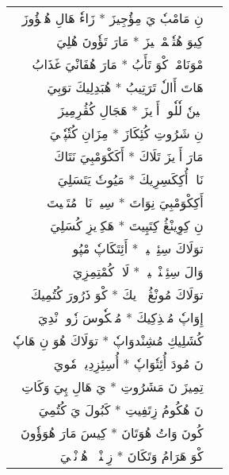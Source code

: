 \documentclass[a4paper, 12pt]{report}
\begin{document}
\begin{longtable}{rl}
\textarabic{نِ مَامْبٗ يَ مِؤُجِيزَ  *  زَاءٗ هَالِ هُڠٖؤُوزَ} & \\ 
\textarabic{كِيوَ هُتٗبٖمْبٖلٖيزَ  *  مَارَ تَؤٗونَ هُلِيَ} & \\ 
[8mm] 

\textarabic{مْوَنَامْكٖ كْوَ تَأَبُ  *  مَارَ هُفَانْيَ غَذَابُ} & \\ 
\textarabic{هَاتَ أَالٗ تَرَتِيبُ  *  هُبَدِلِيكَ توَبِيَ} & \\ 
[8mm] 

\textarabic{نٖينٗ لٗلٗوتٖ أَوٖيزَ  *  هَجَالِ كُڤُرِمِيزَ} & \\ 
\textarabic{نِ شَرُوتِ كُئِكَازَ  *  مِزَانِ كُتٗپٗتٖيَ} & \\ 
[8mm] 

\textarabic{مَارَ أَوٖيزَ تَلَاكَ  *  أَكَكْوَمْبِيَ نَتَاكَ} & \\ 
\textarabic{نَاوٖ أُكِكَسِرِيكَ  *  مَيُوتٗ يَتَسَلِيَ} & \\ 
[8mm] 

\textarabic{أَكِكْوَمْبِيَ نِوَاتَ  *  سِيوٖ نَايٖ مُتَتٖيتَ} & \\ 
\textarabic{نِ كِوِينْڠُ كِتَپِيتَ  *  هَكِوٖيزِ كُسَلِيَ} & \\ 
[8mm] 

\textarabic{توَلَاكَ سِئِتٖلٖيزٖ  *  أَئِتَكَاپٗ مْپُوزٖ} & \\ 
\textarabic{وَالَ سِئِتٖنْدٖكٖيزٖ  *  لَاكٖ كُمْتِمِزِيَ} & \\ 
[8mm] 

\textarabic{توَلَاكَ مُونْڠُ مٖوٖيكَ  *  كْوَ ذَرُورَ كُتُمِيكَ} & \\ 
\textarabic{إِوَاپٗ مُمٖذِكِيكَ  *  مُمٖكٗوسَ زٗوتٖ نْدِيَ} & \\ 
[8mm] 

\textarabic{كُشَلِيكِ مُشِنْدوَاپٗ  *  توَلَاكَ هُوَ نِ هَاپٗ} & \\ 
\textarabic{نَ مُودَ أُئِتٗوَاپٗ  *  أُسِئِزِدِيشٖ مٗويَ} & \\ 
[8mm] 

\textarabic{تِمِيزَ نَ مَشَرُوتِ  *  يَ هَالِ پِيَ وَكَاتِ} & \\ 
\textarabic{نَ هُكُومُ زِتَفِيتِ  *  كَبُولَ يَ كُتُمِيَ} & \\ 
[8mm] 

\textarabic{كُونَ وَاتُ هُوَتَانَ  *  كِيسَ مَارَ هُوَؤٗونَ} & \\ 
\textarabic{كْوَ هَرَامُ وَتَكَانَ  *  زِپٖنْڠٖئٖ هُزٖنْڠٖيَ} & \\ 
[8mm] 


\end{longtable}
\end{document}
